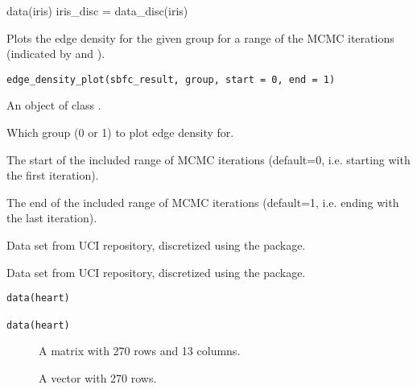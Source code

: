 \documentclass[a4paper]{book}
\begin{document}
%
\begin{Examples}
\begin{ExampleCode}
data(iris)
iris_disc = data_disc(iris)
\end{ExampleCode}
\end{Examples}
%
\begin{Description}\relax
Plots the edge density for the given group for a range of the MCMC iterations (indicated by  and ).
\end{Description}
%
\begin{Usage}
\begin{verbatim}
edge_density_plot(sbfc_result, group, start = 0, end = 1)
\end{verbatim}
\end{Usage}
%
\begin{Arguments}
\begin{ldescription}
\item[\code{sbfc\_result}] An object of class .

\item[\code{group}] Which group (0 or 1) to plot edge density for.

\item[\code{start}] The start of the included range of MCMC iterations (default=0, i.e. starting with the first iteration).

\item[\code{end}] The end of the included range of MCMC iterations (default=1, i.e. ending with the last iteration).
\end{ldescription}
\end{Arguments}
%
\begin{Description}\relax
Data set from UCI repository, discretized using the  package.

Data set from UCI repository, discretized using the  package.
\end{Description}
%
\begin{Usage}
\begin{verbatim}
data(heart)

data(heart)
\end{verbatim}
\end{Usage}
%
\begin{Format}
\begin{description}

\item[] A matrix with 270 rows and 13 columns.
\item[] A vector with 270 rows.

\end{description}
\end{Format}
\end{document}
